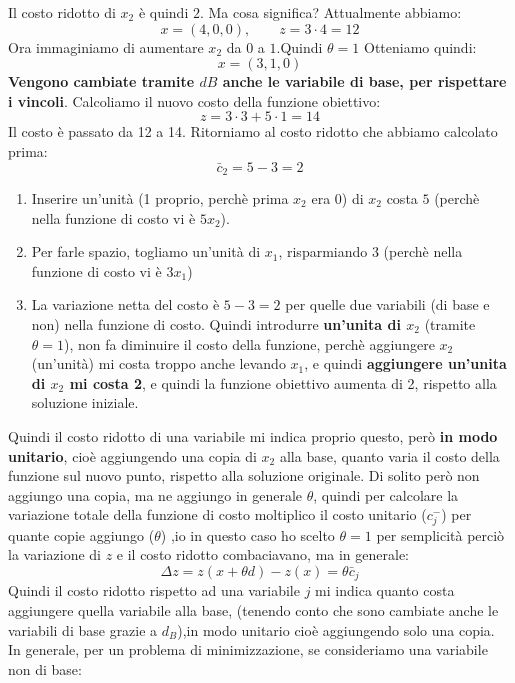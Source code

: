 Il costo ridotto di \(x_2\) è quindi \(2\).
Ma cosa significa?
Attualmente abbiamo:
\[
x=(4,0,0),\qquad z=3\cdot4=12
\]
Ora immaginiamo di aumentare \(x_2\) da \(0\) a \(1\).Quindi $\theta = 1$
Otteniamo quindi:
\[
x=(3,1,0)
\]
\textbf{Vengono cambiate tramite $dB$ anche le variabile di base, per rispettare i vincoli}.
Calcoliamo il nuovo costo della funzione obiettivo:
\[
z=3\cdot3+5\cdot1=14
\]
Il costo è passato da 12 a 14.
Ritorniamo al costo ridotto che abbiamo calcolato prima:
\[
\bar c_2=5-3=2
\]
\begin{enumerate}
    \item Inserire un'unità (1 proprio, perchè prima $x_2$ era 0) di \(x_2\) costa \(5\) (perchè nella funzione di costo vi è $5x_2$).
    \item Per farle spazio, togliamo un'unità di \(x_1\), risparmiando \(3\) (perchè nella funzione di costo vi è $3x_1$)
    \item La variazione netta del costo è \(5-3=2\) per quelle due variabili (di base e non) nella funzione di costo. Quindi introdurre \textbf{un'unita di $x_2$} (tramite $\theta = 1$), non fa diminuire il costo della funzione, perchè aggiungere $x_2$ (un'unità) mi costa troppo anche levando $x_1$, e quindi \textbf{aggiungere un'unita di $x_2$ mi costa 2}, e quindi la funzione obiettivo aumenta di 2, rispetto alla soluzione iniziale.
\end{enumerate}
Quindi il costo ridotto di una variabile mi indica proprio questo, però \textbf{in modo unitario}, cioè aggiungendo una copia di $x_2$ alla base, quanto varia il costo della funzione sul nuovo punto, rispetto alla soluzione originale.
Di solito però non aggiungo una copia, ma ne aggiungo in generale $\theta$, quindi per calcolare la variazione totale della funzione di costo moltiplico il costo unitario ($c^-_j$) per quante copie aggiungo ($\theta$)
,io in questo caso ho scelto $\theta = 1$ per semplicità perciò la variazione di $z$ e il costo ridotto combaciavano, ma in generale:
\[
\Delta z = z(x+\theta d) - z(x) = \theta \bar{c}_j
\]
Quindi il costo ridotto rispetto ad una variabile $j$ mi indica quanto costa aggiungere quella variabile alla base, (tenendo conto che sono cambiate anche le variabili di base grazie a $d_B$),in modo unitario cioè aggiungendo solo una copia.
\\
In generale, per un problema di minimizzazione, se consideriamo una variabile non di base:
